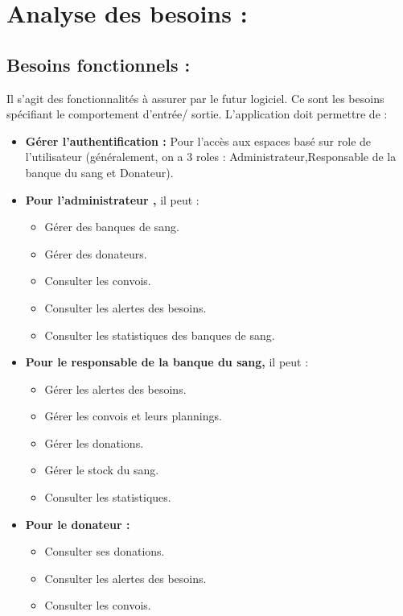 \documentclass[12pt,a4paper,twoside]{report}
\begin{document}
	\section{Analyse des besoins :}{
			\subsection{Besoins fonctionnels :}{
				Il s’agit des fonctionnalités à assurer par le futur logiciel. Ce sont les besoins spécifiant le comportement d’entrée/ sortie. L’application doit permettre de :
				\begin{itemize}[label=\textbullet]
				\item \textbf{Gérer l’authentification :} Pour l’accès aux espaces basé sur role de l’utilisateur (généralement, on a 3 roles : Administrateur,Responsable de la banque du sang et Donateur).
				\item \textbf{Pour l'administrateur ,} il peut :
						\begin{itemize}
							\item Gérer des banques de sang.
							\item Gérer des donateurs.
							\item Consulter les convois.
							\item Consulter les alertes des besoins.
							\item Consulter les statistiques des banques de sang.
						\end{itemize}
				\item \textbf{Pour le responsable de la banque du sang,} il peut :
						\begin{itemize}
								\item Gérer les alertes des besoins.
								\item Gérer les convois et leurs plannings.
								\item Gérer les donations.
								\item Gérer le stock du sang.
								\item Consulter les statistiques.
						\end{itemize}
				\item \textbf{Pour le donateur :}
						\begin{itemize}
								\item Consulter ses donations.
								\item Consulter les alertes des besoins.
								\item Consulter les convois.
						\end{itemize}
			\end{itemize}
			}
}
\end{document}
